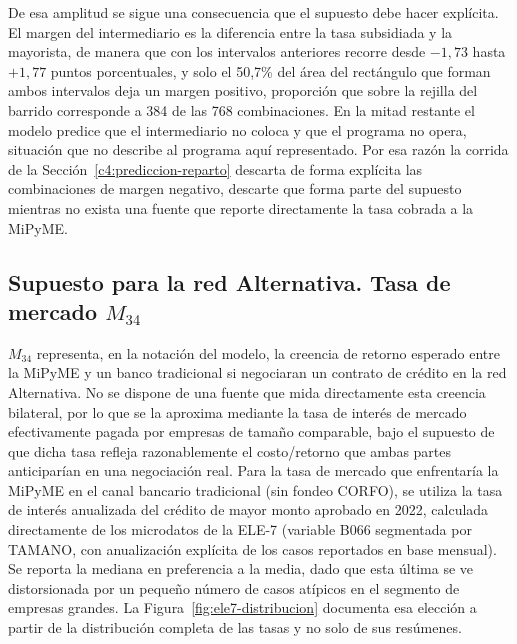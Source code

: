 De esa amplitud se sigue una consecuencia que el supuesto debe hacer explícita. El margen del intermediario es la diferencia entre la tasa subsidiada y la mayorista, de manera que con los intervalos anteriores recorre desde $-1{,}73$ hasta $+1{,}77$ puntos porcentuales, y solo el 50,7\% del área del rectángulo que forman ambos intervalos deja un margen positivo, proporción que sobre la rejilla del barrido corresponde a 384 de las 768 combinaciones. En la mitad restante el modelo predice que el intermediario no coloca y que el programa no opera, situación que no describe al programa aquí representado. Por esa razón la corrida de la Sección~\ref{c4:prediccion-reparto} descarta de forma explícita las combinaciones de margen negativo, descarte que forma parte del supuesto mientras no exista una fuente que reporte directamente la tasa cobrada a la MiPyME.

\subsection[Supuesto para la red Alternativa. Tasa de mercado M34]{Supuesto para la red Alternativa. Tasa de mercado $M_{34}$}
\label{c3:tasa-mercado}

$M_{34}$ representa, en la notación del modelo, la creencia de retorno esperado entre la MiPyME y un banco tradicional si negociaran un contrato de crédito en la red Alternativa. No se dispone de una fuente que mida directamente esta creencia bilateral, por lo que se la aproxima mediante la tasa de interés de mercado efectivamente pagada por empresas de tamaño comparable, bajo el supuesto de que dicha tasa refleja razonablemente el costo/retorno que ambas partes anticiparían en una negociación real. Para la tasa de mercado que enfrentaría la MiPyME en el canal bancario tradicional (sin fondeo CORFO), se utiliza la tasa de interés anualizada del crédito de mayor monto aprobado en 2022, calculada directamente de los microdatos de la ELE-7 \cite{ele7_microdatos_2024} (variable B066 segmentada por TAMANO, con anualización explícita de los casos reportados en base mensual). Se reporta la mediana en preferencia a la media, dado que esta última se ve distorsionada por un pequeño número de casos atípicos en el segmento de empresas grandes. La Figura~\ref{fig:ele7-distribucion} documenta esa elección a partir de la distribución completa de las tasas y no solo de sus resúmenes.


